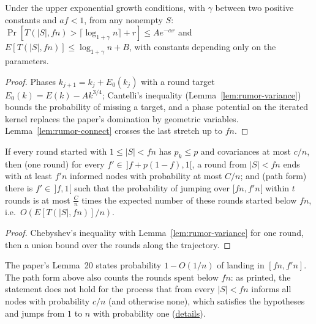 \begin{theorem}\label{thm:rumor-growth}
\leanok{}
Under the upper exponential growth conditions, with $\gamma$ between two positive constants and
$af<1$, from any nonempty $S$: $\Pr[T(|S|,fn)>\lceil\log_{1+\gamma}n\rceil+r]\le Ae^{-\alpha r}$ and
$E[T(|S|,fn)]\le\log_{1+\gamma}n+B$, with constants depending only on the parameters.
\end{theorem}
\begin{proof}\leanok
Phases $k_{j+1}=k_j+E_0(k_j)$ with a round target $E_0(k)=E(k)-Ak^{3/4}$; Cantelli's inequality
(Lemma~\ref{lem:rumor-variance}) bounds the probability of missing a target, and a phase potential
on the iterated kernel replaces the paper's domination by geometric variables. Lemma~\ref{lem:rumor-connect}
crosses the last stretch up to $fn$.
\end{proof}

\begin{lemma}\label{lem:rumor-jump}
\leanok{}
If every round started with $1\le|S|<fn$ has $p_k\le p$ and covariances at most $c/n$, then
(one round) for every $f'\in\,]f+p(1-f),1[$, a round from $|S|<fn$ ends with at least $f'n$
informed nodes with probability at most $C/n$; and (path form) there is $f'\in\,]f,1[$ such that
the probability of jumping over $[fn,f'n[$ within $t$ rounds is at most $\frac Cn$ times the
expected number of these rounds started below $fn$, i.e.\ $O(E[T(|S|,fn)]/n)$.
\end{lemma}
\begin{proof}\leanok
Chebyshev's inequality with Lemma~\ref{lem:rumor-variance} for one round, then a union bound over
the rounds along the trajectory.
\end{proof}
The paper's Lemma~20 states probability $1-O(1/n)$ of landing in $[fn,f'n]$. The path form
above also counts the rounds spent below $fn$: as printed, the statement does not hold for the
process that from every $|S|<fn$ informs all nodes with probability $c/n$ (and otherwise none),
which satisfies the hypotheses and jumps from $1$ to $n$ with probability one
(\href{https://github.com/formal-dynamics/leanamics/blob/main/epidemics/FORMALIZATION_DIFFERENCES.md#lemma-20-and-the-formalized-path-statement}{details}).

